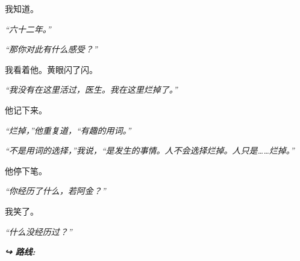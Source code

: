 \noindent 我知道。

\noindent \textit{“六十二年。”}

\noindent \textit{“那你对此有什么感受？”}

\noindent 我看着他。黄眼闪了闪。

\noindent \textit{“我没有在这里活过，医生。我在这里烂掉了。”}

\noindent 他记下来。

\noindent \textit{“烂掉，”他重复道，“有趣的用词。”}

\noindent \textit{“不是用词的选择，”我说，“是发生的事情。人不会选择烂掉。人只是……烂掉。”}

\noindent 他停下笔。

\noindent \textit{“你经历了什么，若阿金？”}

\noindent 我笑了。

\noindent \textit{“什么没经历过？”}

\vspace{0.5em}
\noindent\textit{\textbf{↪ 路线:}  \rotasep {} \rotasep {}}
